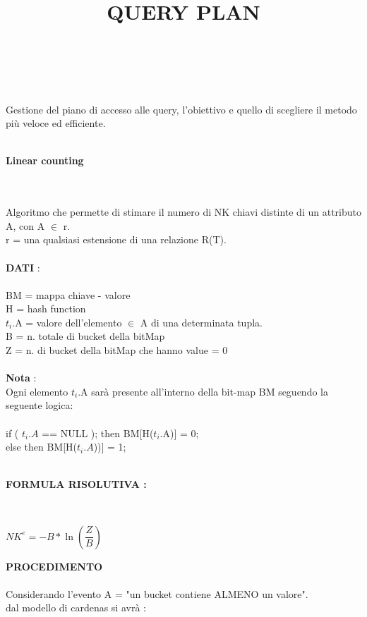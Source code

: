 \documentclass[a4paper,12pt]{article}
\begin{document}
	\begin{titlepage}
	\title{{\huge \textbf{QUERY PLAN}}} \\ \\
	\maketitle
	Gestione del piano di accesso alle query, l'obiettivo e quello di scegliere il metodo più veloce ed efficiente. \\ \\
	\centerline{{\Large \textbf{Linear counting}}} \\ \\
	Algoritmo che permette di stimare il numero di NK chiavi distinte di un attributo A, con A $\in$ r. \\
	r = una qualsiasi estensione di una relazione R(T). \\ \\
	\textbf{DATI} : \\ \\
	BM = mappa chiave - valore \\
	H = hash function \\
	$t_{i}$.A = valore dell'elemento $\in$ A di una determinata tupla. \\
	B = n. totale di bucket della bitMap \\
	Z = n. di bucket della bitMap che hanno value = 0 \\ \\ 
	\textbf{Nota} : \\
	Ogni elemento $t_{i}$.A sarà presente all'interno della bit-map 
	BM seguendo la seguente logica: \\ \\
	if ( ${t_{i}.A}$ == NULL ); then BM[H(${t_{i}}$.A)] = 0; \\
	else then BM[H($t_{i}.A$))] = 1; \\ \\
	\centerline{\textbf{FORMULA RISOLUTIVA : }} \\
	\begin{center}
		${NK^{e} = -B*\ln{(\dfrac{Z}{B})}}$  \\
	\end{center}
	\end{titlepage}
	\textbf{PROCEDIMENTO} \\ \\
	Considerando l'evento A = "un bucket contiene ALMENO un valore". \\
	dal modello di cardenas si avrà :\\ \\
\end{document}
